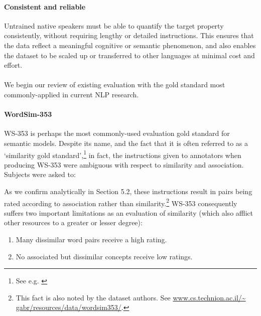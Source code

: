 \paragraph{Consistent and reliable} Untrained native speakers must be able to quantify the target property consistently, without requiring lengthy or detailed instructions. This ensures that the data reflect a meaningful cognitive or semantic phenomenon, and also enables the dataset to be scaled up or transferred to other languages at minimal cost and effort.

\paragraph{}We begin our review of existing evaluation with the gold standard most commonly-applied in current NLP research. 

\noindent 

\paragraph{\bf WordSim-353}WS-353 \cite{finkelstein2001placing} is perhaps the most commonly-used evaluation gold standard for semantic models. Despite its name, and the fact that it is often referred to as a `similarity gold standard',\footnote{See e.g. \cite{huang2012improving,bansal2014tailoring}} in fact, the instructions given to annotators when producing WS-353 were ambiguous with respect to similarity and association. Subjects were asked to: 

\noindent 

As we confirm analytically in Section 5.2, these instructions result in pairs being rated according to association rather than similarity.\footnote{This fact is also noted by the dataset authors. See \url{www.cs.technion.ac.il/~ gabr/resources/data/wordsim353/}.} WS-353 consequently suffers two important limitations as an evaluation of similarity (which also afflict other resources to a greater or lesser degree):  

\begin{enumerate}

\item Many dissimilar word pairs receive a high rating. 

\item No associated but dissimilar concepts receive low ratings. 

\end{enumerate}


